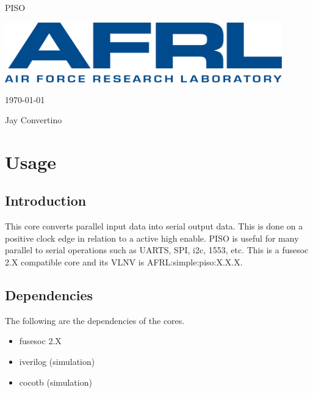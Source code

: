 \begin{titlepage}
  \begin{center}

  {\Huge PISO}

  \vspace{25mm}

  \includegraphics[width=0.90\textwidth,height=\textheight,keepaspectratio]{img/AFRL.png}

  \vspace{25mm}

  \today

  \vspace{15mm}

  {\Large Jay Convertino}

  \end{center}
\end{titlepage}

\tableofcontents

\newpage

\section{Usage}

\subsection{Introduction}

\par
This core converts parallel input data into serial output data. This is done on a positive clock edge in relation to a active high enable. PISO is useful for many parallel to serial operations such as UARTS, SPI, i2c, 1553, etc. This is a fusesoc 2.X compatible core and its VLNV is AFRL:simple:piso:X.X.X.
\subsection{Dependencies}

\par
The following are the dependencies of the cores.

\begin{itemize}
  \item fusesoc 2.X
  \item iverilog (simulation)
  \item cocotb (simulation)
\end{itemize}


